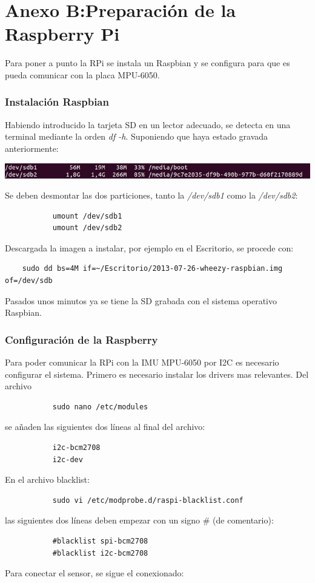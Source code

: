 \documentclass[twoside,11pt]{book}
\begin{document}
\section*{Anexo B:Preparación de la Raspberry Pi}
Para poner a punto la RPi se instala un Raspbian y se configura para que es pueda comunicar con la placa MPU-6050.
\subsubsection*{Instalación Raspbian}
Habiendo introducido la tarjeta SD en un lector adecuado, se detecta en una terminal mediante la orden \textit{df -h}. Suponiendo que haya estado gravada anteriormente:
\begin{center}
\includegraphics[scale=0.7,bb=0 0 766 38]{images/InstalRasp1.png}
\end{center}
Se deben desmontar las dos particiones, tanto la \textit{/dev/sdb1} como la \textit{/dev/sdb2}:
\begin{verbatim}
           umount /dev/sdb1
           umount /dev/sdb2
\end{verbatim}
Descargada la imagen a instalar, por ejemplo en el Escritorio, se procede con:
\begin{verbatim}
    sudo dd bs=4M if=~/Escritorio/2013-07-26-wheezy-raspbian.img of=/dev/sdb
\end{verbatim}
Pasados unos minutos ya se tiene la SD grabada con el sistema operativo Raspbian.
\subsubsection*{Configuración de la Raspberry}
Para poder comunicar la RPi con la IMU MPU-6050 por I2C es necesario configurar el sistema. Primero es necesario instalar los drivers mas relevantes. Del archivo
\begin{verbatim}
           sudo nano /etc/modules
\end{verbatim}
se añaden las siguientes dos líneas al final del archivo:
\begin{verbatim}
           i2c-bcm2708
           i2c-dev
\end{verbatim}
En el archivo blacklist:
\begin{verbatim}
           sudo vi /etc/modprobe.d/raspi-blacklist.conf
\end{verbatim}
las siguientes dos líneas deben empezar con un signo \# (de comentario):
\begin{verbatim}
           #blacklist spi-bcm2708
           #blacklist i2c-bcm2708
\end{verbatim}
Para conectar el sensor, se sigue el conexionado:
\end{document}
